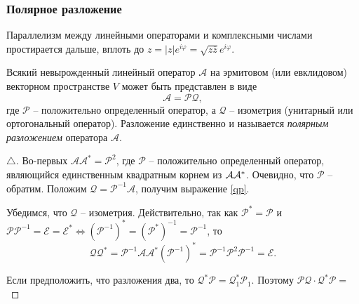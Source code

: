 \subsubsection{Полярное разложение}

Параллелизм между линейными операторами и комплексными числами простирается дальше, вплоть до $z = |z| e^{i \varphi} = \sqrt{z \overline{z}} e^{i \varphi}$.

\begin{to_thr} 
    Всякий невырожденный линейный оператор $\mathcal A$ на эрмитовом (или евклидовом) векторном пространстве $V$ может быть представлен в виде 
    \begin{equation}
    \label{qp}
        \mathcal A = \mathcal P \mathcal Q,
    \end{equation}
    где $\mathcal P$ -- положительно определенный оператор, а $\mathcal Q$ -- изометрия (унитарный или ортогональный оператор). Разложение единственно и называется \textit{полярным разложением} оператора $\mathcal A.$ 
\end{to_thr}


\begin{proof}[$\triangle$]
    Во-первых $\mathcal A \mathcal A^* = \mathcal P^2$, где $\mathcal P$ -- положительно определенный оператор, являющийся единственным квадратным корнем из $\mathcal A \mathcal A^*$. Очевидно, что $\mathcal P$ -- обратим. Положим $\mathcal Q = \mathcal P^{-1} \mathcal A$, получим выражение \eqref{qp}.  

    Убедимся, что $\mathcal Q$ -- изометрия. Действительно, так как $\mathcal P^* = \mathcal P$ и $\mathcal P \mathcal P^{-1} = \mathcal E = \mathcal E^* \Longleftrightarrow \left(\mathcal P^{-1} \right)^* = \left(\mathcal P^*\right)^{-1} = \mathcal P^{-1}$, то
    $$
        \mathcal Q \mathcal Q^*= \mathcal P^{-1} \mathcal A \mathcal A^* \left(\mathcal P^{-1}\right)^* = \mathcal P^{-1} \mathcal P^2 \mathcal P^{-1} = \mathcal E.
    $$

    Если предположить, что разложения два, то $\mathcal Q^* \mathcal P = \mathcal Q_{1}^* \mathcal P_{1}$. Поэтому $\mathcal P \mathcal Q \cdot \mathcal Q^* \mathcal P = $
\end{proof}

